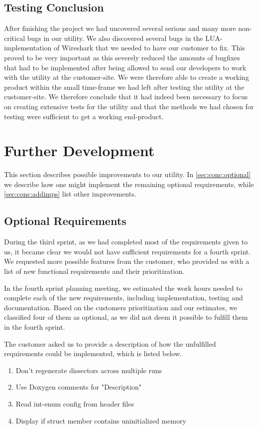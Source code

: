 \subsection{Testing Conclusion}
After finishing the project we had uncovered several serious and many more non-critical bugs in our utility. We also discovered several bugs in the LUA-implementation of Wireshark that we needed to have our customer to fix. This proved to be very important as this severely reduced the amounts of bugfixes that had to be implemented after being allowed to send our developers to work with the utility at the customer-site. We were therefore able to create a working product within the small time-frame we had left after testing the utility at the customer-site. We therefore conclude that it had indeed been necessary to focus on creating extensive tests for the utility and that the methods we had chosen for testing were sufficient to get a working end-product.


\section{Further Development}
\label{sec:eval:furtherdev}
This section describes possible improvements to our utility.
In \autoref{sec:conc:optional} we describe how one might implement the remaining
optional requirements, while \autoref{sec:conc:addimps} list other improvements.

\subsection{Optional Requirements}
\label{sec:conc:optional}
During the third sprint, as we had completed most of the requirements given to
us, it became clear we would not have sufficient requirements for a fourth
sprint. We requested more possible features from the customer, who provided us
with a list of new functional requirements and their prioritization.

In the fourth sprint planning meeting, we estimated the work hours needed to
complete each of the new requirements, including implementation, testing and
documentation. Based on the customers prioritization and our estimates, we
classified four of them as optional, as we did not deem it possible to
fulfill them in the fourth sprint.

The customer asked us to provide a description of how the unfulfilled
requirements could be implemented, which is listed below.
\begin{enumerate}
\item Don't regenerate dissectors across multiple runs
\item Use Doxygen comments for "Description"	
\item Read int-enum config from header files
\item Display if struct member contains uninitialized memory
\end{enumerate}

